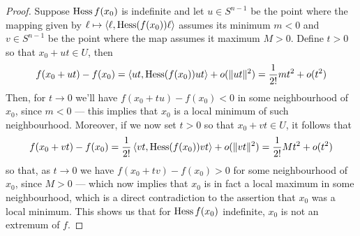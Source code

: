 \begin{proof}
    Suppose \(\operatorname{Hess} f(x_0)\) is indefinite and let \(u \in S^{n-1}\) be the point
    where the mapping given by \(\ell \mapsto \left\langle \ell, \operatorname{Hess}(f(x_0)) \ell \right\rangle\) assumes
    its minimum \(m < 0\) and \(v \in S^{n-1}\) be the point where the map assumes
    it maximum \(M > 0\). Define \(t > 0\) so that \(x_0 + ut \in U\), then
    \[
        f(x_0 + ut) - f(x_0) = \left\langle ut, \operatorname{Hess}(f(x_0)) ut \right\rangle + o(\lVert ut\rVert^2)
        = \frac{1}{2!} mt^2 + o(t^2)
    \]
    Then, for \(t \to 0\) we'll have \(f(x_0 + t u) - f(x_0) < 0\) in some
    neighbourhood of \(x_0\), since \(m < 0\) --- this implies that \(x_0\) is a
    local minimum of such neighbourhood. Moreover, if we now set \(t > 0\)
    so that \(x_0 + vt \in U\), it follows that
    \[
        f(x_0 + vt) - f(x_{0})
        = \frac{1}{2!} \left\langle vt, \operatorname{Hess}(f(x_0)) vt \right\rangle + o(\lVert vt\rVert^2)
        = \frac{1}{2!} M t^2 + o(t^2)
    \]
    so that, as \(t \to 0\) we have \(f(x_0 + t v) - f(x_0) > 0\) for some
    neighbourhood of \(x_0\), since \(M > 0\) --- which now implies that \(x_0\) is
    in fact a local maximum in some neighbourhood, which is a direct contradiction
    to the assertion that \(x_0\) was a local minimum. This shows us that for
    \(\operatorname{Hess} f(x_0)\) indefinite, \(x_0\) is not an extremum of \(f\).
\end{proof}


